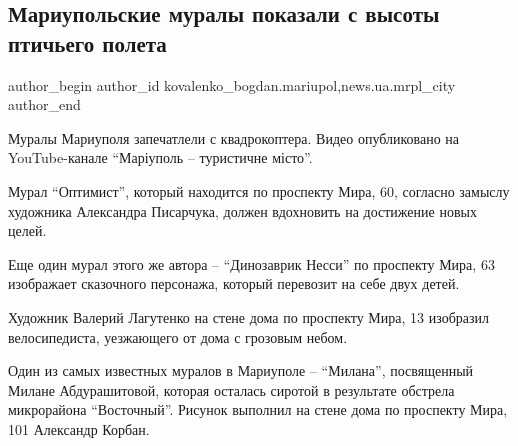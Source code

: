  
 
 
 
 
 
\subsection{Мариупольские муралы показали с высоты птичьего полета}
\label{sec:16_07_2021.stz.news.ua.mrpl_city.1.mariupol_muraly_ptichij_polet}
 
\ifcmt
 author_begin
   author_id kovalenko_bogdan.mariupol,news.ua.mrpl_city
 author_end
\fi

Муралы Мариуполя запечатлели с квадрокоптера. Видео опубликовано на
YouTube-канале \enquote{Маріуполь – туристичне місто}.

Мурал \enquote{Оптимист}, который находится по проспекту Мира, 60, согласно замыслу
художника Александра Писарчука, должен вдохновить на достижение новых целей.


Еще один мурал этого же автора – \enquote{Динозаврик Несси} по проспекту Мира, 63
изображает сказочного персонажа, который перевозит на себе двух детей. 


Художник Валерий Лагутенко на стене дома по проспекту Мира, 13 изобразил
велосипедиста, уезжающего от дома с грозовым небом. 


Один из самых известных муралов в Мариуполе – \enquote{Милана}, посвященный Милане
Абдурашитовой, которая осталась сиротой в результате обстрела микрорайона
\enquote{Восточный}.  Рисунок выполнил на стене дома по проспекту Мира, 101 Александр
Корбан. 

